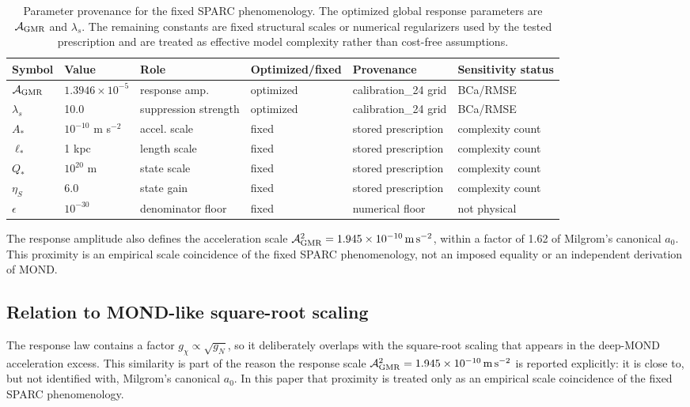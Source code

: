 ﻿\documentclass[twocolumn,linenumbers]{aastex701}
\begin{document}
\begin{table}[t]
\centering
\scriptsize
\setlength{\tabcolsep}{3pt}
\caption{Parameter provenance for the fixed SPARC phenomenology. The optimized global response parameters are $\mathcal{A}_{\rm GMR}$ and $\lambda_s$. The remaining constants are fixed structural scales or numerical regularizers used by the tested prescription and are treated as effective model complexity rather than cost-free assumptions.}
\begin{tabular*}{\textwidth}{@{\extracolsep{\fill}}llllll}
\hline
Symbol & Value & Role & Optimized/fixed & Provenance & Sensitivity status \\
\hline
$\mathcal{A}_{\rm GMR}$ & $1.3946\times10^{-5}$ & response amp. & optimized & calibration\_24 grid & BCa/RMSE \\
$\lambda_s$ & 10.0 & suppression strength & optimized & calibration\_24 grid & BCa/RMSE \\
$A_*$ & $10^{-10}$ m s$^{-2}$ & accel. scale & fixed & stored prescription & complexity count \\
$\ell_*$ & 1 kpc & length scale & fixed & stored prescription & complexity count \\
$Q_*$ & $10^{20}$ m & state scale & fixed & stored prescription & complexity count \\
$\eta_S$ & 6.0 & state gain & fixed & stored prescription & complexity count \\
$\epsilon$ & $10^{-30}$ & denominator floor & fixed & numerical floor & not physical \\
\hline
\end{tabular*}
\end{table}

The response amplitude also defines the acceleration scale $\mathcal{A}_{\rm GMR}^2 = 1.945\times10^{-10}\,{\rm m\,s^{-2}}$, within a factor of 1.62 of Milgrom's canonical $a_0$. This proximity is an empirical scale coincidence of the fixed SPARC phenomenology, not an imposed equality or an independent derivation of MOND.

\subsection{Relation to MOND-like square-root scaling}

The response law contains a factor $g_\chi\propto \sqrt{g_N}$, so it deliberately overlaps with the square-root scaling that appears in the deep-MOND acceleration excess. This similarity is part of the reason the response scale $\mathcal{A}_{\rm GMR}^2=1.945\times10^{-10}\,{\rm m\,s^{-2}}$ is reported explicitly: it is close to, but not identified with, Milgrom's canonical $a_0$. In this paper that proximity is treated only as an empirical scale coincidence of the fixed SPARC phenomenology.
\end{document}
